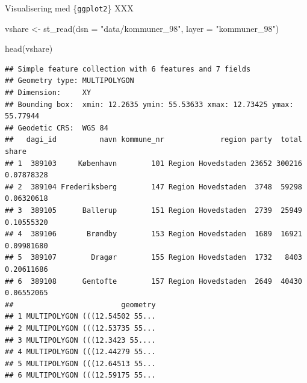 \documentclass[
  8pt,
  ignorenonframetext,
  aspectratio=169]{beamer}
\newenvironment{Shaded}{}{}
\newcommand{\AttributeTok}[1]{\textcolor[rgb]{0.49,0.56,0.16}{#1}}
\newcommand{\FunctionTok}[1]{\textcolor[rgb]{0.02,0.16,0.49}{#1}}
\newcommand{\NormalTok}[1]{#1}
\newcommand{\OtherTok}[1]{\textcolor[rgb]{0.00,0.44,0.13}{#1}}
\newcommand{\StringTok}[1]{\textcolor[rgb]{0.25,0.44,0.63}{#1}}
\begin{document}
\begin{frame}[fragile]{Visualisering med \{\texttt{ggplot2}\}}
\protect\hypertarget{visualisering-med-ggplot2}{}
XXX

\tiny

\begin{Shaded}
\begin{Highlighting}[]
\NormalTok{vshare }\OtherTok{\textless{}{-}} \FunctionTok{st\_read}\NormalTok{(}\AttributeTok{dsn =} \StringTok{"data/kommuner\_98"}\NormalTok{,}
                  \AttributeTok{layer =} \StringTok{"kommuner\_98"}\NormalTok{)}
\end{Highlighting}
\end{Shaded}

\normalsize

\tiny

\begin{Shaded}
\begin{Highlighting}[]
\FunctionTok{head}\NormalTok{(vshare)}
\end{Highlighting}
\end{Shaded}

\begin{verbatim}
## Simple feature collection with 6 features and 7 fields
## Geometry type: MULTIPOLYGON
## Dimension:     XY
## Bounding box:  xmin: 12.2635 ymin: 55.53633 xmax: 12.73425 ymax: 55.77944
## Geodetic CRS:  WGS 84
##   dagi_id          navn kommune_nr             region party  total      share
## 1  389103     København        101 Region Hovedstaden 23652 300216 0.07878328
## 2  389104 Frederiksberg        147 Region Hovedstaden  3748  59298 0.06320618
## 3  389105      Ballerup        151 Region Hovedstaden  2739  25949 0.10555320
## 4  389106       Brøndby        153 Region Hovedstaden  1689  16921 0.09981680
## 5  389107        Dragør        155 Region Hovedstaden  1732   8403 0.20611686
## 6  389108      Gentofte        157 Region Hovedstaden  2649  40430 0.06552065
##                         geometry
## 1 MULTIPOLYGON (((12.54502 55...
## 2 MULTIPOLYGON (((12.53735 55...
## 3 MULTIPOLYGON (((12.3423 55....
## 4 MULTIPOLYGON (((12.44279 55...
## 5 MULTIPOLYGON (((12.64513 55...
## 6 MULTIPOLYGON (((12.59175 55...
\end{verbatim}

\normalsize
\end{frame}
\end{document}
